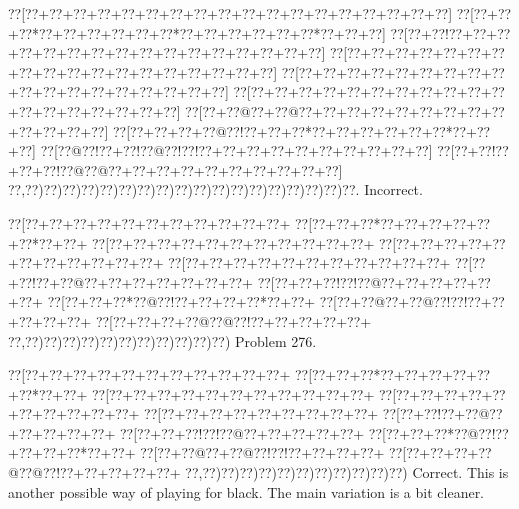 \documentclass[a5paper]{article}
\begin{document}
\begin{center}
{\goo
\0??[\0??+\0??+\0??+\0??+\0??+\0??+\0??+\0??+\0??+\0??+\0??+\0??+\0??+\0??+\0??+\0??+\0??+\0??]
\0??[\0??+\0??+\0??*\0??+\0??+\0??+\0??+\0??+\0??*\0??+\0??+\0??+\0??+\0??+\0??*\0??+\0??+\0??]
\0??[\0??+\0??!\0??+\0??+\0??+\0??+\0??+\0??+\0??+\0??+\0??+\0??+\0??+\0??+\0??+\0??+\0??+\0??]
\0??[\0??+\0??+\0??+\0??+\0??+\0??+\0??+\0??+\0??+\0??+\0??+\0??+\0??+\0??+\0??+\0??+\0??+\0??]
\0??[\0??+\0??+\0??+\0??+\0??+\0??+\0??+\0??+\0??+\0??+\0??+\0??+\0??+\0??+\0??+\0??+\0??+\0??]
\0??[\0??+\0??+\0??+\0??+\0??+\0??+\0??+\0??+\0??+\0??+\0??+\0??+\0??+\0??+\0??+\0??+\0??+\0??]
\0??[\0??+\0??@\0??+\0??@\0??+\0??+\0??+\0??+\0??+\0??+\0??+\0??+\0??+\0??+\0??+\0??+\0??]
\0??[\0??+\0??+\0??+\0??@\0??!\0??+\0??+\0??*\0??+\0??+\0??+\0??+\0??+\0??*\0??+\0??+\0??]
\0??[\0??@\0??!\0??+\0??!\0??@\0??!\0??!\0??+\0??+\0??+\0??+\0??+\0??+\0??+\0??+\0??+\0??]
\0??[\0??+\0??!\0??+\0??+\0??!\0??@\0??@\0??+\0??+\0??+\0??+\0??+\0??+\0??+\0??+\0??+\0??]
\0??,\0??)\0??)\0??)\0??)\0??)\0??)\0??)\0??)\0??)\0??)\0??)\0??)\0??)\0??)\0??)\0??)\0??)\0??.
}
Incorrect. 

\end{center}
\newpage
\begin{center}
{\goo
\0??[\0??+\0??+\0??+\0??+\0??+\0??+\0??+\0??+\0??+\0??+\0??+
\0??[\0??+\0??+\0??*\0??+\0??+\0??+\0??+\0??+\0??*\0??+\0??+
\0??[\0??+\0??+\0??+\0??+\0??+\0??+\0??+\0??+\0??+\0??+\0??+
\0??[\0??+\0??+\0??+\0??+\0??+\0??+\0??+\0??+\0??+\0??+\0??+
\0??[\0??+\0??+\0??+\0??+\0??+\0??+\0??+\0??+\0??+\0??+\0??+
\0??[\0??+\0??!\0??+\0??@\0??+\0??+\0??+\0??+\0??+\0??+\0??+
\0??[\0??+\0??+\0??!\0??!\0??@\0??+\0??+\0??+\0??+\0??+\0??+
\0??[\0??+\0??+\0??*\0??@\0??!\0??+\0??+\0??+\0??*\0??+\0??+
\0??[\0??+\0??@\0??+\0??@\0??!\0??!\0??+\0??+\0??+\0??+\0??+
\0??[\0??+\0??+\0??+\0??@\0??@\0??!\0??+\0??+\0??+\0??+\0??+
\0??,\0??)\0??)\0??)\0??)\0??)\0??)\0??)\0??)\0??)\0??)\0??)
}
Problem 276.

\end{center}
\begin{center}
{\goo
\0??[\0??+\0??+\0??+\0??+\0??+\0??+\0??+\0??+\0??+\0??+\0??+
\0??[\0??+\0??+\0??*\0??+\0??+\0??+\0??+\0??+\0??*\0??+\0??+
\0??[\0??+\0??+\0??+\0??+\0??+\0??+\0??+\0??+\0??+\0??+\0??+
\0??[\0??+\0??+\0??+\0??+\0??+\0??+\0??+\0??+\0??+\0??+
\0??[\0??+\0??+\0??+\0??+\0??+\0??+\0??+\0??+\0??+
\0??[\0??+\0??!\0??+\0??@\0??+\0??+\0??+\0??+\0??+
\0??[\0??+\0??+\0??!\0??!\0??@\0??+\0??+\0??+\0??+\0??+
\0??[\0??+\0??+\0??*\0??@\0??!\0??+\0??+\0??+\0??*\0??+\0??+
\0??[\0??+\0??@\0??+\0??@\0??!\0??!\0??+\0??+\0??+\0??+
\0??[\0??+\0??+\0??+\0??@\0??@\0??!\0??+\0??+\0??+\0??+\0??+
\0??,\0??)\0??)\0??)\0??)\0??)\0??)\0??)\0??)\0??)\0??)\0??)
}
Correct. This is another possible way of playing for black. The main variation is a bit cleaner.

\end{center}
\end{document}
